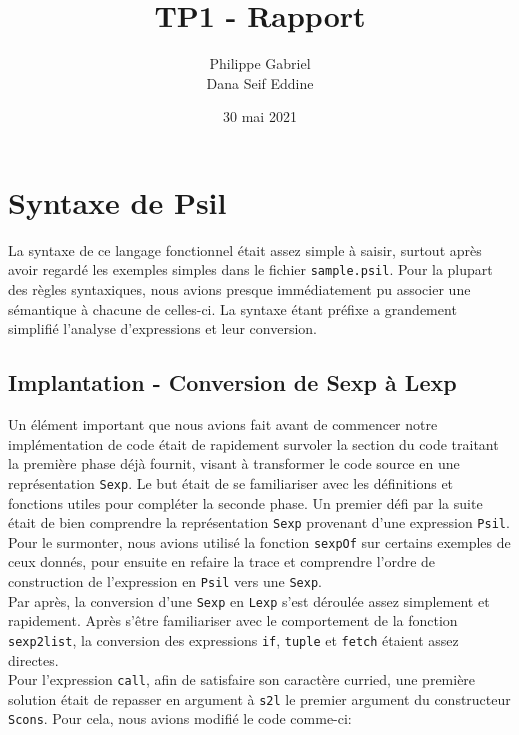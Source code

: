 \documentclass[11pt, titlepage]{article}
\begin{document}
\title{{\Huge \textbf{TP1 - Rapport}}}
\author{Philippe Gabriel \\ Dana Seif Eddine}
\date{30 mai 2021}

\maketitle

\setcounter{page}{2}

\newpage

\section{Syntaxe de Psil}

La syntaxe de ce langage fonctionnel était assez simple à saisir, surtout
après avoir regardé les exemples simples dans le fichier \texttt{sample.psil}.
Pour la plupart des règles syntaxiques, nous avions presque immédiatement pu
associer une sémantique à chacune de celles-ci. La syntaxe étant préfixe a
grandement simplifié l'analyse d'expressions et leur conversion.

\subsection{Implantation - Conversion de Sexp à Lexp}

Un élément important que nous avions fait avant de commencer notre
implémentation de code était de rapidement survoler la section du code traitant
la première phase déjà fournit, visant à transformer le code source en une
représentation \texttt{Sexp}. Le but était de se familiariser avec les
définitions et fonctions utiles pour compléter la seconde phase. Un premier
défi par la suite était de bien comprendre la représentation \texttt{Sexp}
provenant d'une expression \texttt{Psil}. Pour le surmonter, nous avions
utilisé la fonction \texttt{sexpOf} sur certains exemples de ceux donnés, pour
ensuite en refaire la trace et comprendre l'ordre de construction de
l'expression en \texttt{Psil} vers une \texttt{Sexp}. \\

Par après, la conversion d'une \texttt{Sexp} en \texttt{Lexp} s'est déroulée
assez simplement et rapidement. Après s'être familiariser avec le comportement
de la fonction \texttt{sexp2list}, la conversion des expressions \texttt{if},
\texttt{tuple} et \texttt{fetch} étaient assez directes. \\
Pour l'expression \texttt{call}, afin de satisfaire son caractère curried, une
première solution était de repasser en argument à \texttt{s2l} le premier
argument du constructeur \texttt{Scons}. Pour cela, nous avions modifié le code
comme-ci:
\end{document}
